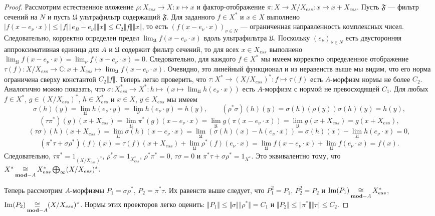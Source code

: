\begin{proof} Рассмотрим естественное вложение $\rho:X_{ess}\to X:x\mapsto x$ и фактор-отображение $\pi:X\to X/X_{ess}:x\mapsto x+X_{ess}$. Пусть $\mathfrak{F}$ --- фильтр сечений на $N$ и пусть $\mathfrak{U}$ ультрафильтр содержащий $\mathfrak{F}$. Для заданного $f\in X ^*$ и $x\in X $ выполнено $|f(x-e_\nu\cdot x)|\leq\Vert f\Vert\Vert e_B - e_\nu\Vert\Vert x\Vert\leq C_2\Vert f\Vert\Vert x\Vert$, то есть $(f(x-e_\nu\cdot x))_{\nu\in N}$ --- ограниченная направленность комплексных чисел. Следовательно, корректно определен предел $\lim_{\mathfrak{U}}f(x-e_\nu\cdot x)$ вдоль ультрафильтра $\mathfrak{U}$. Поскольку $(e_\nu)_{\nu\in N}$ есть двусторонняя аппроксимативная единица для $A$ и $\mathfrak{U}$ содержит фильтр сечений, то для всех $x\in X_{ess}$ выполнено $\lim_{\mathfrak{U}}f(x-e_\nu\cdot x)=\lim_{\nu}f(x-e_\nu\cdot x)=0$. Следовательно, для каждого $f\in X ^*$ мы имеем корректно определенное отображение $\tau(f):X /X_{ess}\to \mathbb{C}:x+X_{ess}\mapsto \lim_{\mathfrak{U}} f(x-e_\nu\cdot x)$. Очевидно, это линейный функционал и из неравенств выше мы видим, что его норма ограничена сверху константой $C_2\Vert f\Vert$. Теперь легко проверить, что $\tau:X^*\to (X/ X_{ess})^*:f\mapsto \tau(f)$ есть $A$-морфизм нормы не более $C_2$. Аналогично можно показать, что $\sigma:X_{ess}^*\to X^*:h\mapsto(x\mapsto \lim_{\mathfrak{U}}h(e_\nu\cdot x))$ есть $A$-морфизм с нормой не превосходящей $C_1$. Для любых $f\in X^*$, $g\in (X/X_{ess})^*$, $h\in X_{ess}^*$ и $x\in X$, $y\in X_{ess}$ мы имеем
$$
\sigma(h)(y)
=\lim_{\mathfrak{U}}h(e_\nu\cdot y)
=\lim_{\nu}h(e_\nu\cdot y)
=h(y),
\qquad
(\rho^*\sigma)(h)(y)
=\sigma(h)(\rho(y))
\sigma(h)(y)
=h(y),
$$
$$
(\tau\pi^*)(g)(x+X_{ess})
=\lim_{\mathfrak{U}}\pi^*(g)(x-e_\nu\cdot x)
=\lim_{\mathfrak{U}}g(\pi(x-e_\nu\cdot x))
=\lim_{\mathfrak{U}}g(x+X_{ess})
=g(x+X_{ess}),
$$
$$
(\tau\sigma)(h)(x+X_{ess})
=\lim_{\mathfrak{U}}\sigma(h)(x-e_\nu\cdot x)
=\lim_{\mathfrak{U}}(\sigma(h)(x)-h(e_\nu\cdot x))
=\sigma(h)(x)-\lim_{\mathfrak{U}}h(e_\nu\cdot x)=0,
$$
$$
(\pi^*\tau + \sigma\rho^*)(f)(x)
=\tau(f)(x+X_{ess})+\lim_{\mathfrak{U}}\rho^*(f)(e_\nu\cdot x)
=\lim_{\mathfrak{U}}f(x - e_\nu\cdot x)+\lim_{\mathfrak{U}}f(e_\nu\cdot x)
=f(x).
$$
Следовательно, $\tau \pi^*=1_{(X/X_{ess})^*}$, $\rho^*\sigma=1_{X_{ess}^*}$, $\rho^*\pi^*=0$, $\tau\sigma=0$ и $\pi^*\tau+\sigma\rho^*=1_{X^*}$. Это эквивалентно тому, что $X^*\mathop{\mathbin{\cong}}\limits_{\mathbf{mod}-A}X_{ess}^*\bigoplus_\infty (X/X_{ess})^*$.

Теперь рассмотрим $A$-морфизмы $P_1=\sigma\rho^*$, $P_2=\pi^*\tau$. Их равенств выше следует, что $P_1^2=P_1$, $P_2^2=P_2$ и $\operatorname{Im}(P_1)\mathop{\mathbin{\cong}}\limits_{\mathbf{mod}-A}X_{ess}^*$, $\operatorname{Im}(P_2)\mathop{\mathbin{\cong}}\limits_{\mathbf{mod}-A} (X/X_{ess})^*$. Нормы этих проекторов легко оценить: $\Vert P_1\Vert\leq\Vert \sigma\Vert\Vert \rho^*\Vert=C_1$ и $\Vert P_2\Vert\leq \Vert \pi^*\Vert\Vert\tau\Vert\leq C_2$.


\end{proof}
